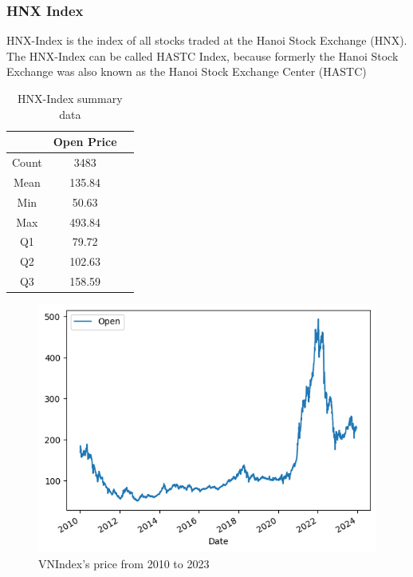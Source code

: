 \documentclass{ieeeojies}
\begin{document}
\subsubsection{HNX Index}
HNX-Index is the index of all stocks traded at the Hanoi Stock Exchange (HNX). The HNX-Index can be called HASTC Index, because formerly the Hanoi Stock Exchange was also known as the Hanoi Stock Exchange Center (HASTC) \cite{e4}
\begin{table}[H]
    \centering
    \begin{tabular}{|c|c|c|}
        \hline
          &  Open Price  \\
        \hline
        Count & 3483  \\
        \hline
        Mean & 135.84  \\
        \hline
        Min & 50.63 \\
        \hline
        Max &  493.84\\
        \hline
        Q1 & 79.72\\
        \hline
        Q2 &  102.63\\
        \hline
        Q3 &  158.59\\
        \hline
    \end{tabular}
    \caption{HNX-Index summary data}
    \label{table:example}
\end{table}
\begin{figure}[H]
    \centering
    \includegraphics[width=0.8\linewidth]{HNX.PNG}
    \caption{VNIndex's price from 2010 to 2023}
    \label{fig:example}
\end{figure}
\end{document}
